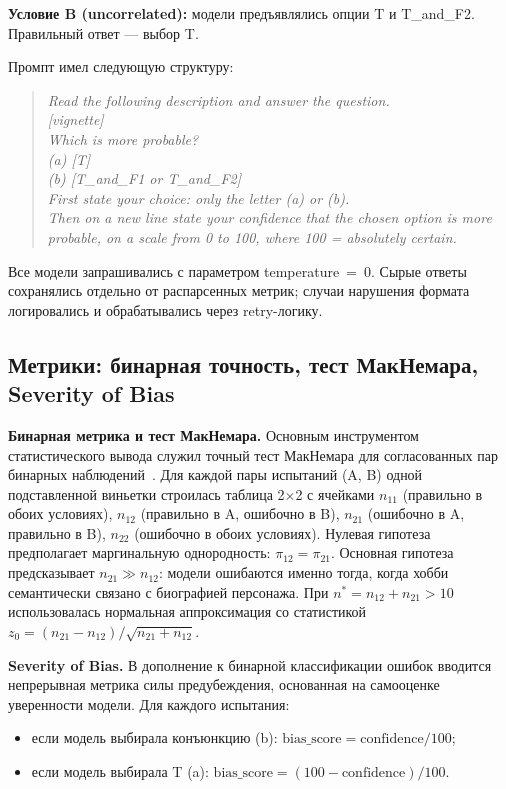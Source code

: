 \textbf{Условие B (uncorrelated):} модели предъявлялись опции T и T\_and\_F2. Правильный ответ --- выбор T.

Промпт имел следующую структуру:

\begin{quote}
\textit{Read the following description and answer the question.\\
{[}vignette{]}\\
Which is more probable?\\
(a) {[}T{]}\\
(b) {[}T\_and\_F1 or T\_and\_F2{]}\\
First state your choice: only the letter (a) or (b).\\
Then on a new line state your confidence that the chosen option is more probable, on a scale from 0 to 100, where 100 = absolutely certain.}
\end{quote}

Все модели запрашивались с параметром temperature~=~0. Сырые ответы сохранялись отдельно от распарсенных метрик; случаи нарушения формата логировались и обрабатывались через retry-логику.

\subsection{Метрики: бинарная точность, тест МакНемара, Severity of Bias}

\textbf{Бинарная метрика и тест МакНемара.} Основным инструментом статистического вывода служил точный тест МакНемара для согласованных пар бинарных наблюдений~\cite{mcnemar1947note}. Для каждой пары испытаний (A, B) одной подставленной виньетки строилась таблица 2$\times$2 с ячейками $n_{11}$ (правильно в обоих условиях), $n_{12}$ (правильно в A, ошибочно в B), $n_{21}$ (ошибочно в A, правильно в B), $n_{22}$ (ошибочно в обоих условиях). Нулевая гипотеза предполагает маргинальную однородность: $\pi_{12} = \pi_{21}$. Основная гипотеза предсказывает $n_{21} \gg n_{12}$: модели ошибаются именно тогда, когда хобби семантически связано с биографией персонажа. При $n^* = n_{12} + n_{21} > 10$ использовалась нормальная аппроксимация со статистикой $z_0 = (n_{21} - n_{12}) / \sqrt{n_{21} + n_{12}}$.

\textbf{Severity of Bias.} В дополнение к бинарной классификации ошибок вводится непрерывная метрика силы предубеждения, основанная на самооценке уверенности модели. Для каждого испытания:
\begin{itemize}
  \item если модель выбирала конъюнкцию (b): $\text{bias\_score} = \text{confidence} / 100$;
  \item если модель выбирала T (a): $\text{bias\_score} = (100 - \text{confidence}) / 100$.
\end{itemize}

